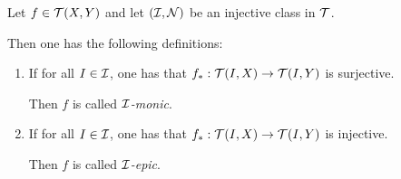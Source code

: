 \begin{definition}
    Let \( f \in {\mathcal{T}}(X, Y) \) and let \( ({\mathcal{I}}, {\mathcal{N}}) \) be an injective class in \( {\mathcal{T}} \).

    Then one has the following definitions:

    \begin{enumerate} %
        \item {If for all \( I \in {\mathcal{I}} \), one has that \( f_*: {\mathcal{T}}(I, X) \to {\mathcal{T}}(I, Y) \) is surjective.
        
        Then \( f \) is called \emph{\( {\mathcal{I}} \)-monic}.}
        
        \item {If for all \( I \in {\mathcal{I}} \), one has that \( f_*: {\mathcal{T}}(I, X) \to {\mathcal{T}}(I, Y) \) is injective.
        
        Then \( f \) is called \emph{\( {\mathcal{I}} \)-epic}.}
    \end{enumerate}
\end{definition}




